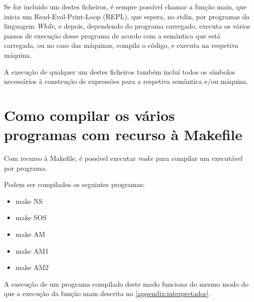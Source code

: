 \documentclass[11pt,a4paper]{report}
\newcommand{\while}[0]{\textit{While}\xspace}
\begin{document}
\par Se for incluido um destes ficheiros, é sempre possível chamar a função main, que inicia um Read-Eval-Print-Loop (REPL), que espera, no stdin, por programas da linguagem \while, e depois, dependendo do programa carregado, executa os vários passos de execução desse programa de acordo com a semântica que está carregada, ou no caso das máquinas, compila o código, e executa na respetiva máquina.

\par A execução de qualquer um destes ficheiros também incluí todos os símbolos necessários à construção de expressões para a respetiva semântica e/ou máquina.

\chapter{Como compilar os vários programas com recurso à Makefile} \label{appendix:compilar}

\par Com recurso à Makefile, é possível executar \textit{make} para compilar um executável por programa.

\par Podem ser compilados os seguintes programas:

\begin{itemize}
    \item make NS
    \item make SOS
    \item make AM
    \item make AM1
    \item make AM2
\end{itemize}

\par A execução de um programa compilado deste modo funciona do mesmo modo do que a execução da função main descrita no \autoref{appendix:interpretador}.
\end{document}
